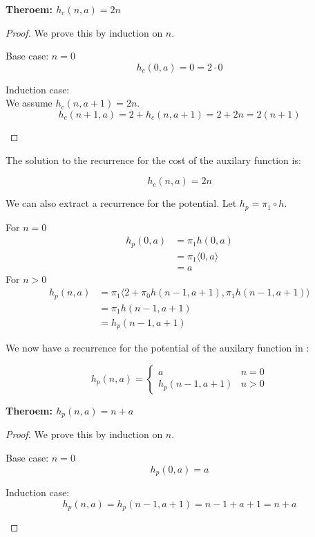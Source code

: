 \textbf{Theroem: $h_c(n,a) = 2n$}
\begin{proof}
  We prove this by induction on $n$.
  \begin{description}
    \item{Base case: $n=0$}\hfill \\
      \[ h_c(0,a) = 0 = 2\cdot0 \]
    \item{Induction case:}\hfill \\
      We assume $h_c(n,a+1) = 2n$.\[h_c(n+1,a) = 2 + h_c(n,a+1) = 2 + 2n = 2(n+1)\]
  \end{description}
\end{proof}  

The solution to the recurrence for the cost of the auxilary function  is:
\begin{framed}
  \[h_c(n,a) = 2n \]
\end{framed}


We can also extract a recurrence for the potential. Let $h_p = \pi_1 \circ h$.

For $n=0$
\begin{align*}
h_p(0,a) &= \pi_1 h(0,a)\\
&= \pi_1 \langle 0, a\rangle\\
&= a
\end{align*}
For $n>0$
\begin{align*}
h_p(n,a) &= \pi_1 \langle 2 + \pi_0 h(n-1,a+1), \pi_1 h(n-1,a+1)\rangle\\
&= \pi_1 h(n-1,a+1)\\
&= h_p (n-1,a+1)
\end{align*}

We now have a recurrence for the potential of the auxilary function in :
\begin{framed}
  \begin{equation}
    h_p(n,a) = \begin{cases}
      a & n = 0 \\
      h_p(n-1,a+1) & n > 0
    \end{cases}
  \end{equation}
\end{framed}

\textbf{Theroem: $h_p(n,a) = n + a$}
\begin{proof}
  We prove this by induction on $n$.
  \begin{description}
    \item{Base case: $n=0$}\hfill \\
      \[ h_p(0,a) = a \]
    \item{Induction case:}\hfill \\
      \[h_p(n,a) = h_p(n-1,a+1) = n - 1 + a + 1 = n + a\]
  \end{description}
\end{proof}  

